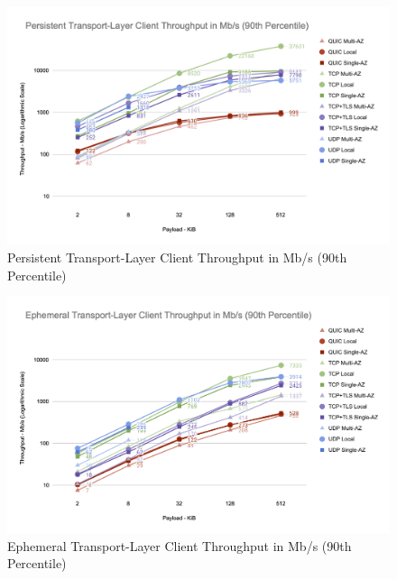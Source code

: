 \clearpage

\begin{figure}[h!]
    \centering
    \includegraphics[width=\linewidth]{figures/charts/Persistent Transport-Layer Client Throughput in Mb_s (90th Percentile).png}
    \caption{Persistent Transport-Layer Client Throughput in Mb/s (90th Percentile)}
    \label{fig:persistent_transport_throughput}
\end{figure}

\begin{figure}[h!]
    \centering
    \includegraphics[width=\linewidth]{figures/charts/Ephemeral Transport-Layer Client Throughput in Mb_s (90th Percentile).png}
    \caption{Ephemeral Transport-Layer Client Throughput in Mb/s (90th Percentile)}
    \label{fig:ephemeral_transport_throughput}
\end{figure}

\clearpage
